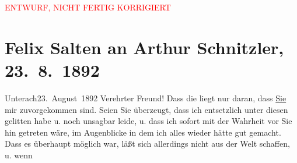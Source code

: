 
\begin{center}
            \textcolor{red}{ENTWURF, NICHT FERTIG KORRIGIERT}
                      \end{center}
            
         
         \renewcommand{\erwaehntePersonen}{Personen: Richard Beer-Hofmann, Hugo von Hofmannsthal, Felix Salten}
         \renewcommand{\erwaehnteOrte}{Orte: Bahnhof, Unterach am Attersee, Wien}
         \renewcommand{\erwaehnteWerke}{}
               \section[Felix Salten an Arthur Schnitzler, 23. 8. 1892]{ Felix Salten an Arthur Schnitzler, 23. 8. 1892}\nopagebreak{}\rehead{ }\begin{ledgroupsized}[t]{13cm}\normalsize\beginnumbering{} \toendnotes[C]{\smallbreak\pagebreak[2]} 
\toendnotes[C]{\smallbreak}\pstart
           \raggedleft{}{\pb}Unterach23. August 1892\pend
           \pstart
           Verehrter Freund! Dass die \label{K_L03113-1v}\label{K_L03113-1h} liegt nur daran, dass \uline{Sie} mir zuvorgekommen
               sind. Seien Sie überzeugt, dass ich entsetzlich unter diesen \label{K_L03113-2v}\label{K_L03113-2h} gelitten habe u. noch unsagbar leide, u. dass ich sofort mit der Wahrheit vor
               Sie hin getreten wäre, im Augenblicke in dem ich alles wieder hätte gut gemacht. Dass
               es überhaupt möglich war, läßt sich allerdings nicht aus der Welt schaffen, u. wenn

\end{ledgroupsized}

